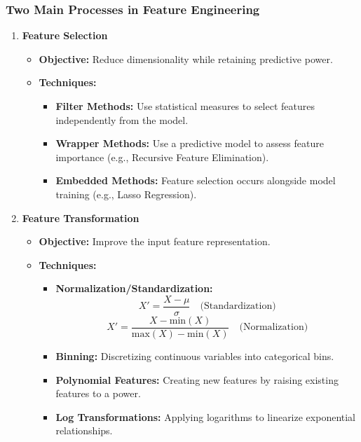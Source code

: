 \documentclass[aspectratio=169]{beamer}
\begin{document}
\begin{frame}[fragile]
  \frametitle{Two Main Processes in Feature Engineering}
  \begin{enumerate}
    \item \textbf{Feature Selection}
      \begin{itemize}
        \item \textbf{Objective:} Reduce dimensionality while retaining predictive power.
        \item \textbf{Techniques:}
          \begin{itemize}
            \item \textbf{Filter Methods:} Use statistical measures to select features independently from the model.
            \item \textbf{Wrapper Methods:} Use a predictive model to assess feature importance (e.g., Recursive Feature Elimination).
            \item \textbf{Embedded Methods:} Feature selection occurs alongside model training (e.g., Lasso Regression).
          \end{itemize}
      \end{itemize}
    \item \textbf{Feature Transformation}
      \begin{itemize}
        \item \textbf{Objective:} Improve the input feature representation.
        \item \textbf{Techniques:}
          \begin{itemize}
            \item \textbf{Normalization/Standardization:}
              \begin{equation}
                X' = \frac{X - \mu}{\sigma} \quad \text{(Standardization)}
              \end{equation}
              \begin{equation}
                X' = \frac{X - \text{min}(X)}{\text{max}(X) - \text{min}(X)} \quad \text{(Normalization)}
              \end{equation}
            \item \textbf{Binning:} Discretizing continuous variables into categorical bins.
            \item \textbf{Polynomial Features:} Creating new features by raising existing features to a power.
            \item \textbf{Log Transformations:} Applying logarithms to linearize exponential relationships.
          \end{itemize}
      \end{itemize}
  \end{enumerate}
\end{frame}
\end{document}
